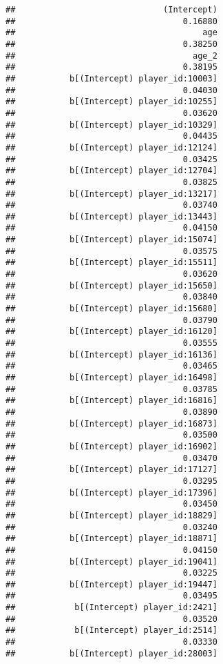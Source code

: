 \documentclass[
]{article}
\begin{document}
\begin{verbatim}
##                              (Intercept) 
##                                  0.16880 
##                                      age 
##                                  0.38250 
##                                    age_2 
##                                  0.38195 
##           b[(Intercept) player_id:10003] 
##                                  0.04030 
##           b[(Intercept) player_id:10255] 
##                                  0.03620 
##           b[(Intercept) player_id:10329] 
##                                  0.04435 
##           b[(Intercept) player_id:12124] 
##                                  0.03425 
##           b[(Intercept) player_id:12704] 
##                                  0.03825 
##           b[(Intercept) player_id:13217] 
##                                  0.03740 
##           b[(Intercept) player_id:13443] 
##                                  0.04150 
##           b[(Intercept) player_id:15074] 
##                                  0.03575 
##           b[(Intercept) player_id:15511] 
##                                  0.03620 
##           b[(Intercept) player_id:15650] 
##                                  0.03840 
##           b[(Intercept) player_id:15680] 
##                                  0.03790 
##           b[(Intercept) player_id:16120] 
##                                  0.03555 
##           b[(Intercept) player_id:16136] 
##                                  0.03465 
##           b[(Intercept) player_id:16498] 
##                                  0.03785 
##           b[(Intercept) player_id:16816] 
##                                  0.03890 
##           b[(Intercept) player_id:16873] 
##                                  0.03500 
##           b[(Intercept) player_id:16902] 
##                                  0.03470 
##           b[(Intercept) player_id:17127] 
##                                  0.03295 
##           b[(Intercept) player_id:17396] 
##                                  0.03450 
##           b[(Intercept) player_id:18829] 
##                                  0.03240 
##           b[(Intercept) player_id:18871] 
##                                  0.04150 
##           b[(Intercept) player_id:19041] 
##                                  0.03225 
##           b[(Intercept) player_id:19447] 
##                                  0.03495 
##            b[(Intercept) player_id:2421] 
##                                  0.03520 
##            b[(Intercept) player_id:2514] 
##                                  0.03330 
##           b[(Intercept) player_id:28003] 

\end{verbatim}
\end{document}
